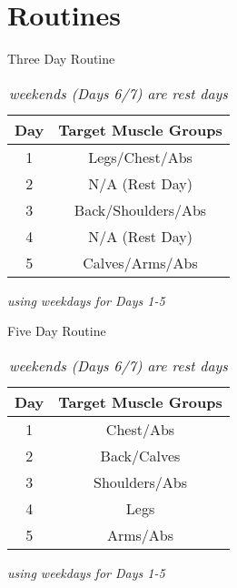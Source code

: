 \documentclass{article}
\begin{document}
    \section{Routines}

    \begin{table}[h!]
    \caption{Three Day Routine}
    \begin{center}
    \begin{tabular}{ |c|c| }
    \hline
    \textbf{Day} & \textbf{Target Muscle Groups} \\
    \hline
    1 & Legs/Chest/Abs \\
    2 & N/A (Rest Day) \\
    3 & Back/Shoulders/Abs \\
    4 & N/A (Rest Day) \\
    5 & Calves/Arms/Abs \\
    \hline
    \end{tabular}
    \end{center}
    \caption*{\textit{using weekdays for Days 1-5}}
    \caption*{\textit{weekends (Days 6/7) are rest days}}
    \end{table}

    \begin{table}[h!]
    \caption{Five Day Routine}
    \begin{center}
    \begin{tabular}{ |c|c| }
    \hline
    \textbf{Day} & \textbf{Target Muscle Groups} \\
    \hline
    1 & Chest/Abs \\
    2 & Back/Calves \\
    3 & Shoulders/Abs \\
    4 & Legs \\
    5 & Arms/Abs \\
    \hline
    \end{tabular}
    \end{center}
    \caption*{\textit{using weekdays for Days 1-5}}
    \caption*{\textit{weekends (Days 6/7) are rest days}}
    \end{table}
\end{document}

